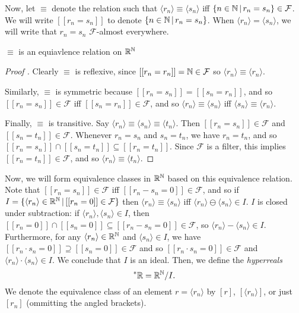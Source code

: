 Now, let $\equiv$ denote the relation such that $\langle r_n \rangle \equiv \langle s_n \rangle$ iff $\{n \in \mathbb{N} \,|\, r_n = s_n\} \in \mathcal{F}$. We will write $[[r_n = s_n]]$ to denote $\{n \in \mathbb{N} \,|\, r_n = s_n\}$. When $\langle r_n \rangle = \langle s_n \rangle$, we will write that $r_n = s_n$ $\mathcal{F}$-almost everywhere.

\begin{thm}
    $\equiv$ is an equiavlence relation on $\mathbb{R}^{\mathbb{N}}$
\end{thm}

\begin{proof}[Proof ]
    Clearly $\equiv$ is reflexive, since $[[r_n = r_n]] = \mathbb{N} \in \mathcal{F}$ so $\langle r_n \rangle \equiv \langle r_n \rangle$.
    
    Similarly, $\equiv$ is symmetric because $[[r_n = s_n]] = [[s_n = r_n]]$, and so $[[r_n = s_n]] \in \mathcal{F}$ iff $[[s_n = r_n]] \in \mathcal{F}$, and so $\langle r_n \rangle \equiv \langle s_n \rangle$ iff $\langle s_n \rangle \equiv \langle r_n \rangle$.

    Finally, $\equiv$ is transitive. Say $\langle r_n \rangle \equiv \langle s_n \rangle \equiv \langle t_n \rangle$. Then $[[r_n = s_n]] \in \mathcal{F}$ and $[[s_n = t_n]] \in \mathcal{F}$. Whenever $r_n = s_n$ and $s_n = t_n$, we have $r_n = t_n$, and so $[[r_n = s_n]] \cap [[s_n = t_n]] \subseteq [[r_n = t_n]]$. Since $\mathcal{F}$ is a filter, this implies $[[r_n = t_n]] \in \mathcal{F}$, and so $\langle r_n \rangle \equiv \langle t_n \rangle$.
\end{proof}

Now, we will form equivalence classes in $\mathbb{R}^{\mathbb{N}}$ based on this equivalence relation. Note that $[[r_n = s_n]] \in \mathcal{F}$ iff $[[r_n - s_n = 0]] \in \mathcal{F}$, and so if $I = \{\langle r_n \rangle \in \mathbb{R}^{\mathbb{N}} \,|\, [[r_n = 0]] \in \mathcal{F}\}$ then $\langle r_n \rangle \equiv \langle s_n \rangle$ iff $\langle r_n \rangle \ominus \langle s_n \rangle \in I$. $I$ is closed under subtraction: if $\langle r_n \rangle, \langle s_n \rangle \in I$, then $[[r_n = 0]] \cap [[s_n = 0]] \subseteq [[r_n - s_n = 0]] \in \mathcal{F}$, so $\langle r_n \rangle - \langle s_n \rangle \in I$. Furthermore, for any $\langle r_n \rangle \in \mathbb{R}^{\mathbb{N}}$ and $\langle s_n \rangle \in I$, we have $[[r_n \cdot s_n = 0]] \supseteq [[s_n = 0]] \in \mathcal{F}$ and so $[[r_n \cdot s_n = 0]] \in \mathcal{F}$ and $\langle r_n \rangle \cdot \langle s_n \rangle \in I$. We conclude that $I$ is an ideal. Then, we define the \textit{hyperreals}
\[ \prescript{*}{}{\mathbb{R}} = \mathbb{R}^{\mathbb{N}} / I. \]
We denote the equivalence class of an element $r = \langle r_n \rangle$ by $[r]$, $[\langle r_n \rangle]$, or just $[r_n]$ (ommitting the angled brackets).

